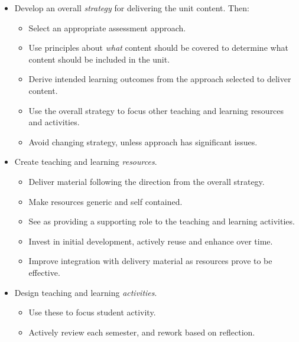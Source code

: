 %
%
%
%


\begin{itemize}[noitemsep,nolistsep]
	\item Develop an overall \emph{strategy} for delivering the unit content. Then:
	\begin{itemize}[noitemsep,nolistsep]
		\item Select an appropriate assessment approach.
		\item Use principles about \emph{what} content should be covered to determine what content should be included in the unit.
		\item Derive intended learning outcomes from the approach selected to deliver content.
		\item Use the overall strategy to focus other teaching and learning resources and activities.
		\item Avoid changing strategy, unless approach has significant issues.
	\end{itemize}

	\item Create teaching and learning \emph{resources}.
	\begin{itemize}[noitemsep,nolistsep]
		\item Deliver material following the direction from the overall strategy.
		\item Make resources generic and self contained.
		\item See as providing a supporting role to the teaching and learning activities.
		\item Invest in initial development, actively reuse and enhance over time.
		\item Improve integration with delivery material as resources prove to be effective.
	\end{itemize}

	\item Design teaching and learning \emph{activities}.
	\begin{itemize}[noitemsep,nolistsep]
		\item Use these to focus student activity.
		\item Actively review each semester, and rework based on reflection.
	\end{itemize}
\end{itemize} 

